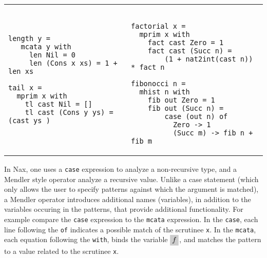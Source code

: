 \vspace*{.1in}
\begin{tabular}{l|l}
\begin{minipage}[l]{.42\linewidth}
{\small
\begin{verbatim}
length y = 
   mcata y with
     len Nil = 0
     len (Cons x xs) = 1 + len xs

tail x = 
  mprim x with
    tl cast Nil = []
    tl cast (Cons y ys) = (cast ys )
\end{verbatim}}
\end{minipage}

& 

\begin{minipage}[l]{.50\linewidth}
{\small
\begin{verbatim}

factorial x =
  mprim x with
    fact cast Zero = 1
    fact cast (Succ n) = 
        (1 + nat2int(cast n)) * fact n
                      
fibonocci n =
  mhist n with
    fib out Zero = 1
    fib out (Succ n) = 
        case (out n) of
          Zero -> 1
          (Succ m) -> fib n + fib m 
\end{verbatim}}
\end{minipage}
\end{tabular}
\vspace*{.1in}

In Nax, one uses a \verb+case+ expression to analyze
a non-recursive type, and a Mendler style operator analyze
a recursive value. Unlike a
case statement (which only allows the user to specify patterns against which the
argument is matched), a Mendler operator introduces additional names (variables),
in addition to the variables occuring in the patterns, that
provide additional functionality. For example compare the \verb+case+ expression
to the \verb+mcata+ expression. In the \verb+case+, each line following the \verb+of+
indicates a possible match of the scrutinee \verb+x+. In the \verb+mcata+,
each equation following the \verb+with+, binds the variable $\newFi{f}$, and
matches the pattern to a value related to the scrutinee \verb+x+.

